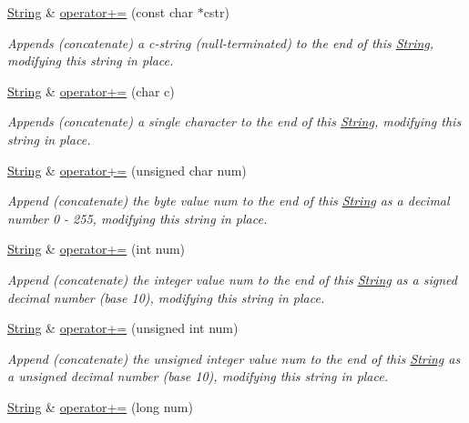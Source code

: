 \begin{DoxyCompactItemize}
\hyperlink{class_string}{String} \& \hyperlink{class_string_ab41e81fc0c337cab456509994d12f097}{operator+=} (const char $\ast$cstr)
\begin{DoxyCompactList}\small\item\em Appends (concatenate) a c-\/string (null-\/terminated) to the end of this \hyperlink{class_string}{String}, modifying this string in place. \end{DoxyCompactList}\item 
\hyperlink{class_string}{String} \& \hyperlink{class_string_aea2e862c41c9995a7cb2201cd92c2851}{operator+=} (char c)
\begin{DoxyCompactList}\small\item\em Appends (concatenate) a single character to the end of this \hyperlink{class_string}{String}, modifying this string in place. \end{DoxyCompactList}\item 
\hyperlink{class_string}{String} \& \hyperlink{class_string_a26be7d08426b6cf307f1eb2e9bff095a}{operator+=} (unsigned char num)
\begin{DoxyCompactList}\small\item\em Append (concatenate) the byte value num to the end of this \hyperlink{class_string}{String} as a decimal number 0 -\/ 255, modifying this string in place. \end{DoxyCompactList}\item 
\hyperlink{class_string}{String} \& \hyperlink{class_string_acc979c8832f66d8d953aaa7d81d305c1}{operator+=} (int num)
\begin{DoxyCompactList}\small\item\em Append (concatenate) the integer value num to the end of this \hyperlink{class_string}{String} as a signed decimal number (base 10), modifying this string in place. \end{DoxyCompactList}\item 
\hyperlink{class_string}{String} \& \hyperlink{class_string_aca854f6e679697e98e940b8d2b51956e}{operator+=} (unsigned int num)
\begin{DoxyCompactList}\small\item\em Append (concatenate) the unsigned integer value num to the end of this \hyperlink{class_string}{String} as a unsigned decimal number (base 10), modifying this string in place. \end{DoxyCompactList}\item 
\hyperlink{class_string}{String} \& \hyperlink{class_string_a2638de5d162cb9395bd2837458cef124}{operator+=} (long num)

\end{DoxyCompactItemize}
